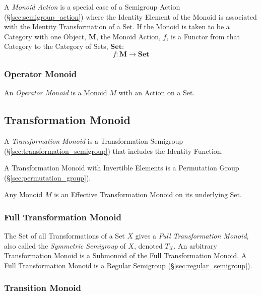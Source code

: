 A \emph{Monoid Action} is a special case of a Semigroup Action
(\S\ref{sec:semigroup_action}) where the Identity Element of the
Monoid is associated with the Identity Transformation of a Set. If the
Monoid is taken to be a Category with one Object, $\mathbf{M}$, the
Monoid Action, $f$, is a Functor from that Category to the Category of
Sets, $\mathbf{Set}$:
\[
  f : \mathbf{M} \rightarrow \mathbf{Set}
\]


\subsubsection{Operator Monoid}\label{sec:operator_monoid}

An \emph{Operator Monoid} is a Monoid $M$ with an Action on a Set.



\subsection{Transformation Monoid}\label{sec:transformation_monoid}

A \emph{Transformation Monoid} is a Transformation Semigroup
(\S\ref{sec:transformation_semigroup}) that includes the Identity
Function.

A Transformation Monoid with Invertible Elements is a Permutation
Group (\S\ref{sec:permutation_group}).

Any Monoid $M$ is an Effective Transformation Monoid on its underlying
Set.



\subsubsection{Full Transformation Monoid}\label{sec:full_transformation}

The Set of all Transformations of a Set $X$ gives a \emph{Full
  Transformation Monoid}, also called the \emph{Symmetric Semigroup}
of $X$, denoted $T_X$. An arbitrary Transformation Monoid is a
Submonoid of the Full Transformation Monoid. A Full Transformation
Monoid is a Regular Semigroup (\S\ref{sec:regular_semigroup}).



\subsubsection{Transition Monoid}\label{sec:transition_monoid}

